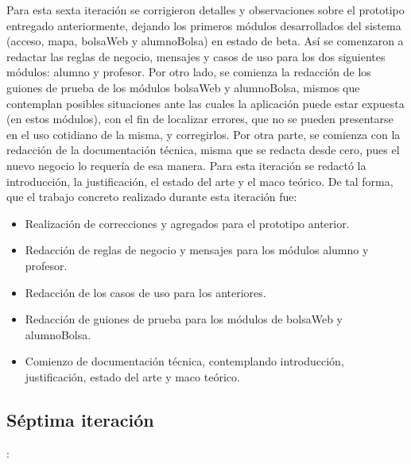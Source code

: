 \noindent
Para esta sexta iteración se corrigieron detalles y observaciones sobre el prototipo entregado anteriormente, dejando los primeros módulos desarrollados del sistema (acceso, mapa, bolsaWeb y alumnoBolsa) en estado de beta. Así se comenzaron a redactar las reglas de negocio, mensajes y casos de uso para los dos siguientes módulos: alumno y profesor. Por otro lado, se comienza la redacción de los guiones de prueba de los módulos bolsaWeb y alumnoBolsa, mismos que contemplan posibles situaciones ante las cuales la aplicación puede estar expuesta (en estos módulos), con el fin de localizar errores, que no se pueden presentarse en el uso cotidiano de la misma, y corregirlos.
\newline
Por otra parte, se comienza con la redacción de la documentación técnica, misma que se redacta desde cero, pues el nuevo negocio lo requería de esa manera. Para esta iteración se redactó la introducción, la justificación, el estado del arte y el maco teórico.
\newline
De tal forma, que el trabajo concreto realizado durante esta iteración fue:
\begin{itemize}
	\item Realización de correcciones y agregados para el prototipo anterior.
	\item Redacción de reglas de negocio y mensajes para los módulos alumno y profesor.
	\item Redacción de los casos de uso para los anteriores.
	\item Redacción de guiones de prueba para los módulos de bolsaWeb y alumnoBolsa.
	\item Comienzo de documentación técnica, contemplando introducción, justificación, estado del arte y maco teórico.
\end{itemize}



\subsection{Séptima iteración}: 

